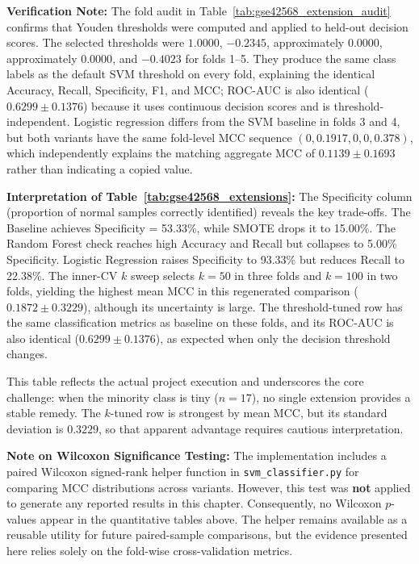 \textbf{\textsf{Verification Note:}} The fold audit in Table~\ref{tab:gse42568_extension_audit} confirms that Youden thresholds were computed and applied to held-out decision scores. The selected thresholds were $1.0000$, $-0.2345$, approximately $0.0000$, approximately $0.0000$, and $-0.4023$ for folds 1--5. They produce the same class labels as the default SVM threshold on every fold, explaining the identical Accuracy, Recall, Specificity, F1, and MCC; ROC-AUC is also identical ($0.6299 \pm 0.1376$) because it uses continuous decision scores and is threshold-independent. Logistic regression differs from the SVM baseline in folds 3 and 4, but both variants have the same fold-level MCC sequence $(0, 0.1917, 0, 0, 0.378)$, which independently explains the matching aggregate MCC of $0.1139 \pm 0.1693$ rather than indicating a copied value.

\medskip

\textbf{\textsf{Interpretation of Table~\ref{tab:gse42568_extensions}:}} The Specificity column (proportion of normal samples correctly identified) reveals the key trade-offs. The Baseline achieves Specificity = 53.33\%, while SMOTE drops it to 15.00\%. The Random Forest check reaches high Accuracy and Recall but collapses to 5.00\% Specificity. Logistic Regression raises Specificity to 93.33\% but reduces Recall to 22.38\%. The inner-CV $k$ sweep selects $k=50$ in three folds and $k=100$ in two folds, yielding the highest mean MCC in this regenerated comparison ($0.1872 \pm 0.3229$), although its uncertainty is large. The threshold-tuned row has the same classification metrics as baseline on these folds, and its ROC-AUC is also identical ($0.6299 \pm 0.1376$), as expected when only the decision threshold changes.

This table reflects the actual project execution and underscores the core challenge: when the minority class is tiny ($n=17$), no single extension provides a stable remedy. The $k$-tuned row is strongest by mean MCC, but its standard deviation is $0.3229$, so that apparent advantage requires cautious interpretation.

\medskip

\textbf{\textsf{Note on Wilcoxon Significance Testing:}} The implementation includes a paired Wilcoxon signed-rank helper function in \texttt{svm\_classifier.py} for comparing MCC distributions across variants. However, this test was \textbf{not} applied to generate any reported results in this chapter. Consequently, no Wilcoxon $p$-values appear in the quantitative tables above. The helper remains available as a reusable utility for future paired-sample comparisons, but the evidence presented here relies solely on the fold-wise cross-validation metrics.

